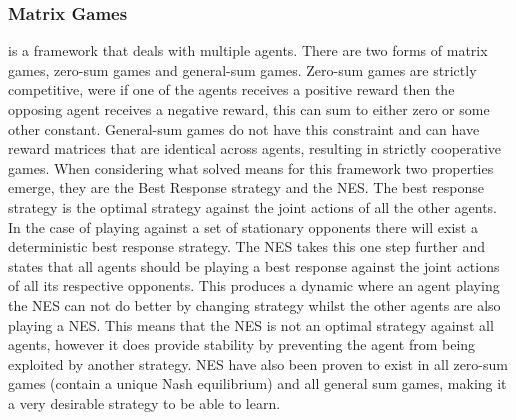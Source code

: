 \documentclass[conference]{IEEEtran}
\begin{document}
\subsubsection{Matrix Games} is a framework that deals with multiple agents\cite{basar1999dynamic}. There are two forms of matrix games, zero-sum games and general-sum games. Zero-sum games are strictly competitive, were if one of the agents receives a positive reward then the opposing agent receives a negative reward, this can sum to either zero or some other constant. General-sum games do not have this constraint and can have reward matrices that are identical across agents, resulting in strictly cooperative games. When considering what solved means for this framework two properties emerge, they are the Best Response strategy and the NES. The best response strategy is the optimal strategy against the joint actions of all the other agents. In the case of playing against a set of stationary opponents there will exist a deterministic best response strategy. The NES takes this one step further and states that all agents should be playing a best response against the joint actions of all its respective opponents. This produces a dynamic where an agent playing the NES can not do better by changing strategy whilst the other agents are also playing a NES. This means that the NES is not an optimal strategy against all agents, however it does provide stability by preventing the agent from being exploited by another strategy. NES have also been proven to exist in all zero-sum games (contain a unique Nash equilibrium) and all general sum games, making it a very desirable strategy to be able to learn.
\end{document}
